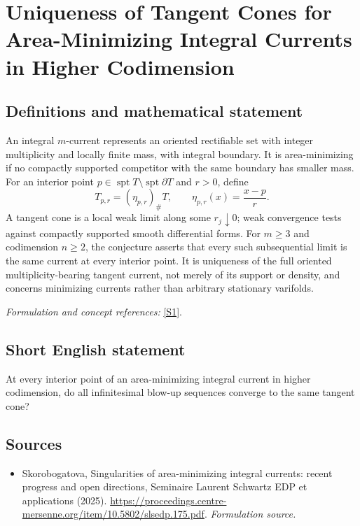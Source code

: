 \documentclass[11pt]{article}
\begin{document}
\section*{\texorpdfstring{Uniqueness of Tangent Cones for Area-Minimizing Integral Currents in Higher Codimension}{Uniqueness of Tangent Cones for Area-Minimizing Integral Currents in Higher Codimension}}\label{30006918}
\subsection{Definitions and mathematical statement}
An integral $m$-current represents an oriented rectifiable set with integer multiplicity and locally finite mass, with integral boundary. It is area-minimizing if no compactly supported competitor with the same boundary has smaller mass. For an interior point $p\in\operatorname{spt}T\setminus\operatorname{spt}\partial T$ and $r>0$, define
\[
 T_{p,r}=(\eta_{p,r})_\#T,
 \qquad\eta_{p,r}(x)=\frac{x-p}{r}.
\]
A tangent cone is a local weak limit along some $r_j\downarrow0$; weak convergence tests against compactly supported smooth differential forms. For $m\ge3$ and codimension $n\ge2$, the conjecture asserts that every such subsequential limit is the same current at every interior point. It is uniqueness of the full oriented multiplicity-bearing tangent current, not merely of its support or density, and concerns minimizing currents rather than arbitrary stationary varifolds.
\par\smallskip\textit{Formulation and concept references:} \href{https://proceedings.centre-mersenne.org/item/10.5802/slsedp.175.pdf}{[S1]}.

\subsection{Short English statement}
At every interior point of an area-minimizing integral current in higher codimension, do all infinitesimal blow-up sequences converge to the same tangent cone?
\subsection{Sources}
\begin{itemize}
\item[S1]Skorobogatova, Singularities of area-minimizing integral currents: recent progress and open directions, Seminaire Laurent Schwartz EDP et applications (2025).
\url{https://proceedings.centre-mersenne.org/item/10.5802/slsedp.175.pdf}.
\textit{Formulation source.}
\end{itemize}
\end{document}
